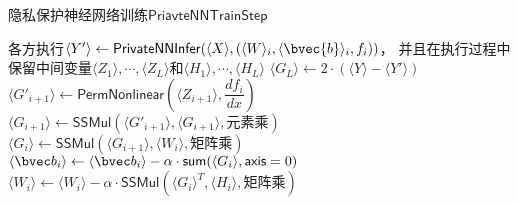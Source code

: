 %
\begin{algorithm}[h!]
\caption{隐私保护神经网络训练$\mathsf{PriavteNNTrainStep}$}
\label{alg:ss-perm:infer}
    \begin{algorithmic}[1]
    \State 各方执行$\langle Y' \rangle \gets \mathsf{PrivateNNInfer}(\langle X \rangle, (\langle W \rangle_i, \langle \bvec{b} \rangle_i, f_i))$，
        并且在执行过程中保留中间变量$\langle Z_1 \rangle, \cdots, \langle Z_L \rangle$和$\langle H_1 \rangle, \cdots, \langle H_L \rangle$
    \State $\langle G_L \rangle \gets 2 \cdot (\langle Y \rangle - \langle Y' \rangle)$
     
        \State $\langle G'_{i + 1} \rangle \gets \mathsf{PermNonlinear}(\langle Z_{i+1} \rangle, \dfrac{df_i}{dx})$ 
        \State $\langle G_{i + 1} \rangle \gets \mathsf{SSMul}(\langle G'_{i+1} \rangle, \langle G_{i+1} \rangle, \text{元素乘})$
        \State $\langle G_{i} \rangle \gets \mathsf{SSMul}(\langle G_{i+1} \rangle, \langle W_i \rangle, \text{矩阵乘})$ 
        \State $\langle \bvec b_i \rangle \gets \langle \bvec b_i \rangle - \alpha \cdot \mathsf{sum}(\langle G_i \rangle, \mathsf{axis}=0)$ 
        \State $\langle W_i \rangle \gets \langle W_i \rangle - \alpha \cdot \mathsf{SSMul}(\langle G_i \rangle^T, \langle H_i \rangle, \text{矩阵乘})$
    \EndFor
\end{algorithmic}
\end{algorithm}

%